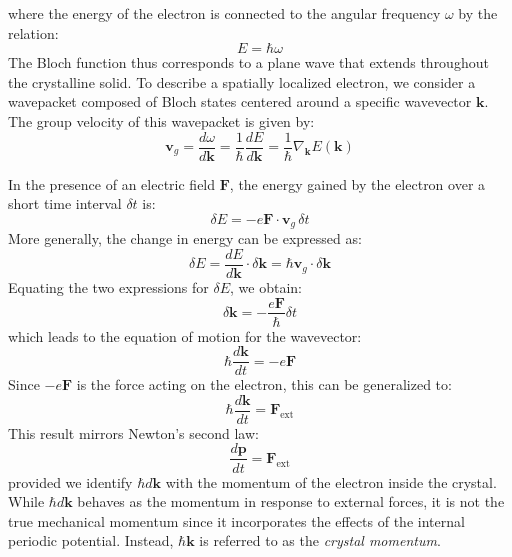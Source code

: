 \noindent where the energy of the electron is connected to the angular frequency \( \omega \) by the relation:
\begin{equation*}
	E = \hbar \omega
\end{equation*}
\noindent The Bloch function thus corresponds to a plane wave that extends throughout the crystalline solid. To describe a spatially localized electron, we consider a wavepacket composed of Bloch states centered around a specific wavevector \( \mathbf{k} \). The group velocity of this wavepacket is given by:
\begin{equation*}
	\mathbf{v}_g = \frac{d\omega}{d\mathbf{k}} = \frac{1}{\hbar} \frac{dE}{d\mathbf{k}} = \frac{1}{\hbar} \nabla_{\mathbf{k}} E(\mathbf{k})
\end{equation*}

In the presence of an electric field \( \mathbf{F} \), the energy gained by the electron over a short time interval \( \delta t \) is:
\begin{equation*}
	\delta E = -e \mathbf{F} \cdot \mathbf{v}_g \, \delta t
\end{equation*}
\noindent More generally, the change in energy can be expressed as:
\begin{equation*}
	\delta E = \frac{dE}{d\mathbf{k}} \cdot \delta \mathbf{k} = \hbar \mathbf{v}_g \cdot \delta \mathbf{k}
\end{equation*}
\noindent Equating the two expressions for \( \delta E \), we obtain:
\begin{equation*}
	\delta \mathbf{k} = -\frac{e \mathbf{F}}{\hbar} \delta t
\end{equation*}
\noindent which leads to the equation of motion for the wavevector:
\begin{equation*}
	\hbar \frac{d\mathbf{k}}{dt} = -e \mathbf{F}
\end{equation*}
\noindent Since \( -e\mathbf{F} \) is the force acting on the electron, this can be generalized to:
\begin{equation*}
	\hbar \frac{d\mathbf{k}}{dt} = \mathbf{F}_{\text{ext}}
\end{equation*}
\noindent This result mirrors Newton’s second law:
\begin{equation*}
	\frac{d\mathbf{p}}{dt} = \mathbf{F}_{\text{ext}}
\end{equation*}
\noindent provided we identify \( \hbar d\mathbf{k} \) with the momentum of the electron inside the crystal. While \( \hbar d\mathbf{k} \) behaves as the momentum in response to external forces, it is not the true mechanical momentum since it incorporates the effects of the internal periodic potential. Instead, \( \hbar \mathbf{k} \) is referred to as the \textit{crystal momentum}.

